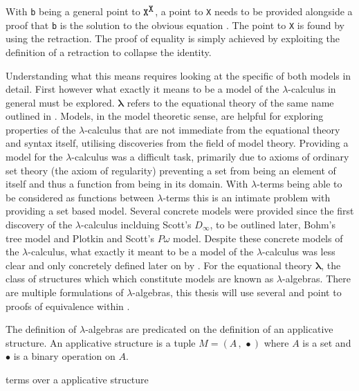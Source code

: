 
With \verb|b| being a general point to $\verb|X|^{\verb|X|}$, a point to
\verb|X| needs to be provided alongside a proof that \verb|b| is the solution to
the obvious equation . The point to \verb|X| is found by
using the retraction. The proof of equality is simply achieved by exploiting the
definition of a retraction to collapse the identity.



Understanding what this means requires looking at the specific of both models in
detail. First however what exactly it means to be a model of the
$\lambda$-calculus in general must be explored. 
$\bm{\lambda}$ refers to the equational theory of the same name outlined in
. Models, in the model theoretic sense, are helpful for
exploring properties of the $\lambda$-calculus that are not immediate from the
equational theory and syntax itself, utilising discoveries from the field of
model theory. Providing a model for the $\lambda$-calculus was a difficult task,
primarily due to axioms of ordinary set theory (the axiom of regularity)
preventing a set from being an element of itself and thus a function from being
in its domain. With $\lambda$-terms being able to be considered as functions
between $\lambda$-terms this is an intimate problem with providing a set based
model. Several concrete models were provided since the first discovery of the
$\lambda$-calculus inclduing Scott's $D_{\infty}$, to be outlined later, Bohm's
tree model and Plotkin and Scott's $P\omega$ model. Despite these concrete
models of the $\lambda$-calculus, what exactly it meant to be a model of the
$\lambda$-calculus was less clear and only concretely defined later on by
. For the equational theory $\bm{\lambda}$, the
class of structures which which constitute models are known as
$\lambda$-algebras. There are multiple formulations of $\lambda$-algebras, this
thesis will use several and point to proofs of equivalence within
.

The definition of $\lambda$-algebras are predicated on the definition of an
applicative structure. An applicative structure is a tuple $M = (A \, , \,
\bullet)$ where $A$ is a set and $\bullet$ is a binary operation on $A$.

terms over a applicative structure


